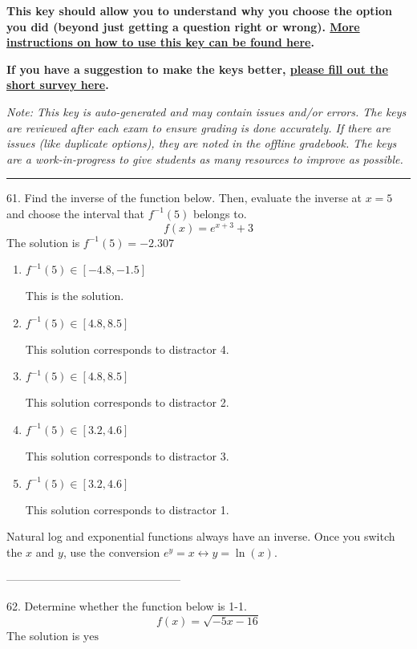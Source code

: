\documentclass{extbook}[14pt]
\begin{document}
\textbf{This key should allow you to understand why you choose the option you did (beyond just getting a question right or wrong). \href{https://xronos.clas.ufl.edu/mac1105spring2020/courseDescriptionAndMisc/Exams/LearningFromResults}{More instructions on how to use this key can be found here}.}

\textbf{If you have a suggestion to make the keys better, \href{https://forms.gle/CZkbZmPbC9XALEE88}{please fill out the short survey here}.}

\textit{Note: This key is auto-generated and may contain issues and/or errors. The keys are reviewed after each exam to ensure grading is done accurately. If there are issues (like duplicate options), they are noted in the offline gradebook. The keys are a work-in-progress to give students as many resources to improve as possible.}

\rule{\textwidth}{0.4pt}

61. Find the inverse of the function below. Then, evaluate the inverse at $x = 5$ and choose the interval that $f^{-1}(5)$ belongs to.
\[ f(x) = e^{x+3}+3 \] 
The solution is $ f^{-1}(5) = -2.307 $ 

\begin{enumerate}[label=\Alph*.] 
\item $ f^{-1}(5) \in [-4.8, -1.5] $ 

  This is the solution. 
\item $ f^{-1}(5) \in [4.8, 8.5] $ 

  This solution corresponds to distractor 4. 
\item $ f^{-1}(5) \in [4.8, 8.5] $ 

  This solution corresponds to distractor 2. 
\item $ f^{-1}(5) \in [3.2, 4.6] $ 

  This solution corresponds to distractor 3. 
\item $ f^{-1}(5) \in [3.2, 4.6] $ 

  This solution corresponds to distractor 1. 
\end{enumerate} 
 
Natural log and exponential functions always have an inverse. Once you switch the $x$ and $y$, use the conversion $ e^y = x \leftrightarrow y=\ln(x)$.

-----------------------------------------------

62. Determine whether the function below is 1-1.
\[ f(x) = \sqrt{-5 x - 16} \] 
The solution is $ \text{yes} $ 
\end{document}
